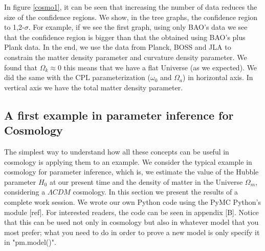 \documentclass[onecolumn,           %
               showpacs,            %
               preprintnumbers,     %
               aps,                 %
               prl,          	    %
               letterpaper,             %
               superscriptaddress,      %
               nofootinbib,         %
               tightenlines,        %
               floats,floatfix      %
               ,usenatbib,
               ]{revtex4-1}
\begin{document}
In figure \ref{cosmo1}, it can be seen that increasing the number of data reduces the size of the confidence regions. We show, in the tree graphs, the confidence region to 1,2-$\sigma$. For example, if we see the first graph, using only BAO's data we see that the confidence region is bigger than that the obtained using BAO's plus Plank data. In the end, we use the data from Planck, BOSS and JLA to constrain the matter density parameter and curvature density parameter. We found that $\Omega_k \approx 0$ this means that we have a flat Universe (as we expected). We did the same with the CPL parameterization ($\omega_0$ and  $\Omega_a$) in horizontal axis. In vertical axis we have the total matter density parameter.

\subsection{A first example in parameter inference for Cosmology}

The simplest way to understand how all these concepts can be useful in cosmology is applying them to an example. We consider the typical example in cosmology for parameter inference, which is, we estimate the value of the Hubble parameter $H_0$ at our present time and the density of matter in the Universe $\Omega_m$, considering a $\Lambda CDM$ cosmology. In this section we present the results of a complete work session. We wrote our own Python code using the PyMC Python's module [ref]. For interested readers, the code can be seen in appendix [B]. Notice that this can be used not only in cosmology but also in whatever model that you most prefer; what you need to do in order to prove a new model is only specify it in "pm.model()". 

%
\end{document}
